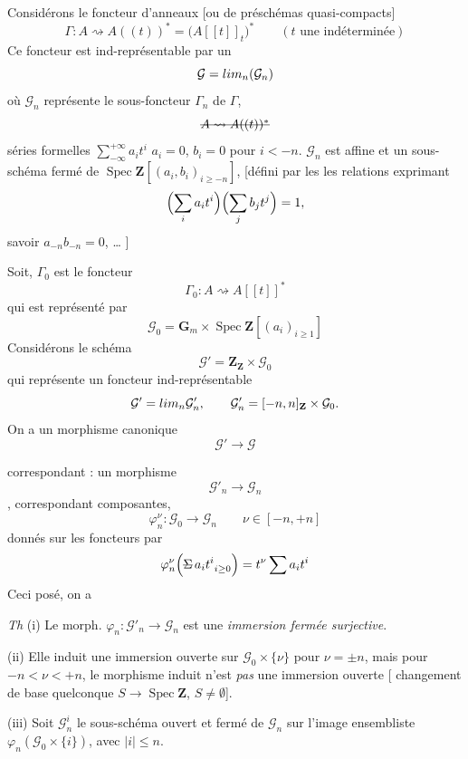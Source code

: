 \documentclass[11pt,a4paper]{article}
\begin{document}
Considérons le foncteur d'anneaux [ou de préschémas quasi-compacts]
\[
  \Gamma : A \rightsquigarrow A((t))^{*} = \bigl(A[[t]]_t\bigr)^{*} \qquad (t \text{ une indéterminée})
\]
Ce foncteur est ind-représentable par un
\[
  \mathcal{G} = \varinjlim_n (\mathcal{G}_n)
\]
où $\mathcal{G}_n$ représente le sous-foncteur $\Gamma_n$ de $\Gamma$, \ill{}
\[
  \text{\struck{$A \rightsquigarrow A((t))^{*}$}}
\]
\ill{} séries formelles $\sum_{-\infty}^{+\infty} a_i t^i$  $a_i = 0$, $b_i = 0$ pour $i < -n$. $\mathcal{G}_n$ est affine et \ill{} \ill{} un sous-schéma fermé de $\operatorname{Spec} \mathbf{Z}[(a_i, b_i)_{i \geq -n}]$, [défini par les \ill{} \ill{} les relations exprimant
\[
  \Bigl(\sum_i a_i t^i\Bigr)\Bigl(\sum_j b_j t^j\Bigr) = 1 ,
\]
savoir $a_{-n} b_{-n} = 0$, … ]

 Soit, $\Gamma_0$ est le foncteur
\[
  \Gamma_0 : A \rightsquigarrow A[[t]]^{*}
\]
qui est représenté par
\[
  \mathcal{G}_0 = \mathbf{G}_m \times \operatorname{Spec} \mathbf{Z}[(a_i)_{i \geq 1}]
\]
Considérons le schéma
\[
  \mathcal{G}' = \mathbf{Z}_{\mathbf{Z}} \times \mathcal{G}_0
\]
qui représente un foncteur ind-représentable
\[
  \mathcal{G}' = \varinjlim_n \mathcal{G}'_n , \qquad \mathcal{G}'_n = [-n, n]_{\mathbf{Z}} \times \mathcal{G}_0 .
\]
On a un morphisme canonique
\[
  \mathcal{G}' \longrightarrow \mathcal{G}
\]

correspondant : un morphisme
\[
  \mathcal{G}'_n \longrightarrow \mathcal{G}_n
\]
 \ill{} \ill{}, correspondant  composantes, 
\[
  \varphi_n^{\nu} : \mathcal{G}_0 \longrightarrow \mathcal{G}_n \qquad \nu \in [-n, +n]
\]
donnés  sur les foncteurs par
\[
  \varphi_n^{\nu}\Bigl(\text{\struck{$\Sigma$}}\, a_i t^i_{\ i \geq 0}\Bigr) = t^{\nu} \sum a_i t^i
\]
Ceci posé, on a

\emph{Th} (i) Le morph. $\varphi_n : \mathcal{G}'_n \to \mathcal{G}_n$ est une \emph{immersion fermée surjective}.

(ii) Elle induit une immersion ouverte sur $\mathcal{G}_0 \times \{\nu\}$ pour $\nu = \pm n$, mais pour $-n < \nu < +n$, le morphisme induit n'est \emph{pas} une immersion ouverte [  changement de base quelconque $S \to \operatorname{Spec} \mathbf{Z}$, $S \neq \emptyset$].

(iii) Soit $\mathcal{G}_n^i$ le sous-schéma ouvert  et fermé de $\mathcal{G}_n$ \struck{\ill{}} sur l'image ensembliste \struck{\ill{}} $\varphi_n(\mathcal{G}_0 \times \{i\})$, avec $|i| \leq n$.
\end{document}
